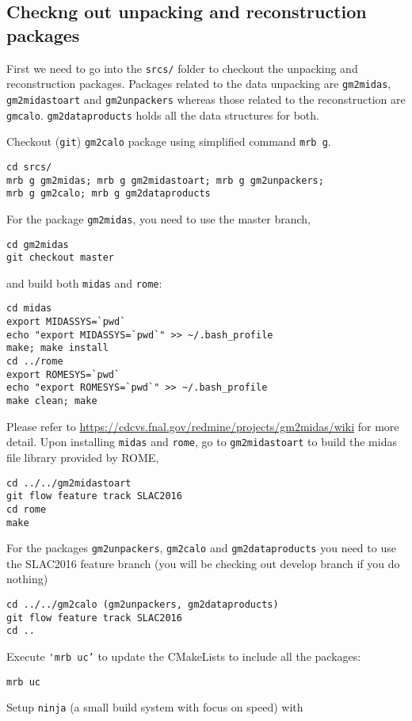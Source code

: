\subsection{Checkng out unpacking and reconstruction packages}
First we need to go into the \verb+srcs/+ folder to checkout the unpacking and reconstruction packages. 
Packages related to the data unpacking are \verb+gm2midas+, \verb+gm2midastoart+ and \verb+gm2unpackers+ whereas those related to the reconstruction are
\verb+gmcalo+. \verb+gm2dataproducts+ holds all the data structures for both.

Checkout (\verb+git+) \verb+gm2calo+ package using simplified command \verb+mrb g+.
%
\begin{Verbatim}[frame=single]
cd srcs/
mrb g gm2midas; mrb g gm2midastoart; mrb g gm2unpackers;
mrb g gm2calo; mrb g gm2dataproducts
\end{Verbatim}
%
For the package \verb+gm2midas+, you need to use the master branch,
%
\begin{Verbatim}[frame=single]
cd gm2midas
git checkout master
\end{Verbatim}
%
and build both \verb+midas+ and \verb+rome+:
%
\begin{Verbatim}[frame=single]
cd midas
export MIDASSYS=`pwd`
echo "export MIDASSYS=`pwd`" >> ~/.bash_profile
make; make install
cd ../rome
export ROMESYS=`pwd`
echo "export ROMESYS=`pwd`" >> ~/.bash_profile
make clean; make
\end{Verbatim}
%
Please refer to \url{https://cdcvs.fnal.gov/redmine/projects/gm2midas/wiki} for more detail.
Upon installing \verb+midas+ and \verb+rome+, go to \verb+gm2midastoart+ to build the midas file library provided by ROME,
%
\begin{Verbatim}[frame=single]
cd ../../gm2midastoart
git flow feature track SLAC2016
cd rome
make
\end{Verbatim}
%
For the packages \verb+gm2unpackers+, \verb+gm2calo+ and \verb+gm2dataproducts+
you need to use the SLAC2016 feature branch (you will be checking out develop branch if you do nothing)
%
\begin{Verbatim}[frame=single]
cd ../../gm2calo (gm2unpackers, gm2dataproducts)
git flow feature track SLAC2016
cd ..
\end{Verbatim}
%
Execute \verb+'mrb uc’+ to update the CMakeLists to include all the packages:
%
\begin{Verbatim}[frame=single]
mrb uc
\end{Verbatim}
%
Setup \verb+ninja+ (a small build system with focus on speed) with
